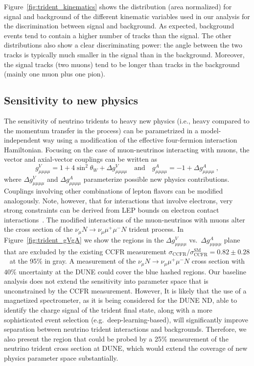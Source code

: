 Figure~\ref{fig:trident_kinematics} shows the distribution (area normalized) for signal and background of the different kinematic variables used in our analysis for the discrimination between signal and background. As expected, background events tend to contain a higher number of tracks than the signal. The other distributions also show a clear discriminating power: the angle between the two tracks is typically much smaller in the signal than in the background. Moreover, the signal tracks (two muons) tend to be longer than tracks in the background (mainly one muon plus one pion).

\subsection{Sensitivity to new physics} 
The sensitivity of neutrino tridents to heavy new physics (i.e., heavy compared to the momentum transfer in the process) can be parametrized in a model-independent way using a modification of the effective four-fermion interaction Hamiltonian. Focusing on the case of muon-neutrinos interacting with muons, the vector and axial-vector couplings can be written as
\begin{equation}
g_{\mu\mu\mu\mu}^V = 1 + 4 \sin^2\theta_W + \Delta g_{\mu\mu\mu\mu}^V \quad \mathrm{and} \quad g_{\mu\mu\mu\mu}^A = -1 + \Delta g_{\mu\mu\mu\mu}^A ~,
\end{equation}
where $\Delta g_{\mu\mu\mu\mu}^V$ and $\Delta g_{\mu\mu\mu\mu}^A$ parameterize possible new physics contributions. Couplings involving other combinations of lepton flavors can be modified analogously. Note, however, that for interactions that involve electrons, very strong constraints can be derived from LEP bounds on electron contact interactions~\cite{Schael:2013ita}. The modified interactions of the muon-neutrinos with muons alter the cross section of the $\nu_\mu N \to \nu_\mu \mu^+\mu^- N$ trident process. In Figure~\ref{fig:trident_gVgA} we show the regions in the $\Delta g^V_{\mu\mu\mu\mu}$ vs.\ $\Delta g^A_{\mu\mu\mu\mu}$ plane that are excluded by the existing CCFR measurement $\sigma_\text{CCFR} / \sigma_\text{CCFR}^\text{SM} = 0.82 \pm 0.28$~\cite{Mishra:1991bv} at the 95\%  in gray. A measurement of the $\nu_\mu N \to \nu_\mu \mu^+\mu^- N$ cross section with $40\%$ uncertainty at the DUNE   could cover the blue hashed regions. Our baseline analysis does not extend the sensitivity into parameter space that is unconstrained by the CCFR measurement. However, It is likely that the use of a magnetized spectrometer, as it is being considered for the DUNE ND, able to identify the charge signal of the trident final state, along with a more sophisticated  event selection (e.g.\ deep-learning-based), will significantly improve separation between neutrino trident interactions and backgrounds. Therefore, we also present the region that could be probed by a 25\% measurement of the neutrino trident cross section at DUNE, which would extend the coverage of new physics parameter space substantially.

